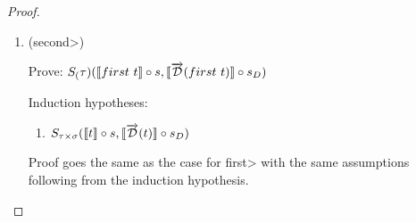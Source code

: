 \documentclass[11pt, final]{article}
\begin{document}
\begin{proof}
\begin{enumerate}
      \begin{align*}
        S&_{\tau}(\llbracket first\ t \rrbracket \circ s, \llbracket \D(first\ t) \rrbracket \circ s_D) \\
        & \Vdash \text{(Rewrite using definition of $\D$)} \\
        & S_{\tau}(\llbracket first\ t \rrbracket \circ s, \llbracket first\ \D(t) \rrbracket \circ s_D) \\
        & \Vdash \text{(Rewrite using definition of $\llbracket\rrbracket$)} \\
        & S_{\tau}(\lambda x. fst(\llbracket t \rrbracket(s(x))), \lambda x. fst(\llbracket \D(t) \rrbracket(s_D(x)))) \\
        & \Vdash \text{(Rewrite using \ref{eqn:subst_ass_proj1_6} and \ref{eqn:subst_ass_proj1_7})} \\
        & S_{\tau}(\lambda x. fst(f_1(x), g_1(x)), \lambda x. fst(f_2(x), g_2(x))) \\
        & \Vdash \text{($\beta\eta$-equality)} \\
        & S_{\tau}(f_1, f_2) \\
        & \Vdash \text{(Assumption \ref{eqn:subst_ass_proj1_4})} \\
      \end{align*} \qed

      \item (\<second>)

      Prove: $S_(\tau)(\llbracket first\ t \rrbracket \circ s, \llbracket \overrightarrow{\mathcal{D}}(first\ t) \rrbracket \circ s_D)$

      Induction hypotheses:
      \begin{enumerate}
        \item \label{eqn:subst_ih_first}$S_{\tau\times\sigma}(\llbracket t \rrbracket \circ s, \llbracket \overrightarrow{\mathcal{D}}(t) \rrbracket \circ s_D)$
      \end{enumerate}

      Proof goes the same as the case for \<first> with the same assumptions following from the induction hypothesis.


\end{enumerate}
\end{proof}
\end{document}
